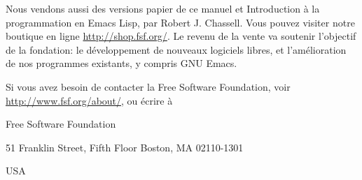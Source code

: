Nous vendons aussi des versions papier de ce manuel et Introduction à
la programmation en Emacs Lisp, par Robert J. Chassell. Vous pouvez
visiter notre boutique en ligne \url{http://shop.fsf.org/}. Le revenu
de la vente va soutenir l'objectif de la fondation: le développement
de nouveaux logiciels libres, et l'amélioration de nos programmes
existants, y compris GNU Emacs.\par

Si vous avez besoin de contacter la Free Software Foundation, voir
\url{http://www.fsf.org/about/}, ou écrire à 

Free Software Foundation

51 Franklin Street, Fifth Floor Boston, MA 02110-1301

USA \par


